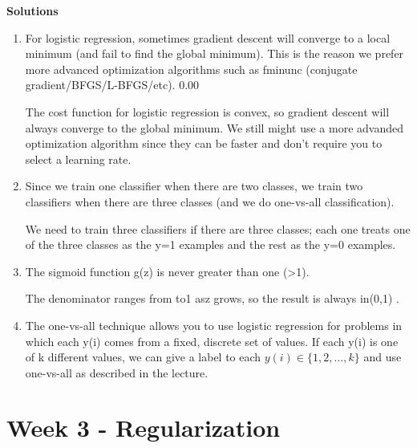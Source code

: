 \textbf{Solutions}
\begin{enumerate}
\item For logistic regression, sometimes gradient descent will converge to a local minimum (and fail to find the global minimum). This is the reason we prefer more advanced optimization algorithms such as fminunc (conjugate gradient/BFGS/L-BFGS/etc).  0.00

The cost function for logistic regression is convex, so gradient descent will always converge to the global minimum. We still might use a more advanded optimization algorithm since they can be faster and don't require you to select a learning rate. 

\item
Since we train one classifier when there are two classes, we train two classifiers when there are three classes (and we do one-vs-all classification).  

We need to train three classifiers if there are three classes; each one treats one of the three classes as the y=1 examples and the rest as the y=0 examples. 

\item
The sigmoid function g(z) is never greater than one (>1).   

The denominator ranges from  to1 asz grows, so the result is always in(0,1) . 
\item
The one-vs-all technique allows you to use logistic regression for problems in which each y(i) comes from a fixed, discrete set of values. 
If each y(i) is one of k different values, we can give a label to each $y(i)\in\{1,2,\ldots,k\}$ and use one-vs-all as described in the lecture. 

\end{enumerate}













	
	
	\newpage
	\section{Week 3 - Regularization }
	
